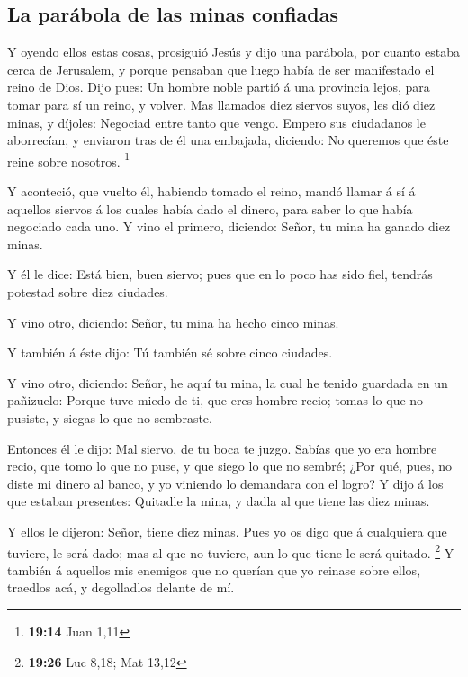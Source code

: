 \hypertarget{la-paruxe1bola-de-las-minas-confiadas}{%
\subsection{La parábola de las minas
confiadas}\label{la-paruxe1bola-de-las-minas-confiadas}}

 Y oyendo ellos estas cosas, prosiguió Jesús y dijo una
parábola, por cuanto estaba cerca de Jerusalem, y porque pensaban que
luego había de ser manifestado el reino de Dios.  Dijo
pues: Un hombre noble partió á una provincia lejos, para tomar para sí
un reino, y volver.  Mas llamados diez siervos suyos, les
dió diez minas, y díjoles: Negociad entre tanto que vengo.
 Empero sus ciudadanos le aborrecían, y enviaron tras de
él una embajada, diciendo: No queremos que éste reine sobre nosotros.
\footnote{\textbf{19:14} Juan 1,11}

 Y aconteció, que vuelto él, habiendo tomado el reino,
mandó llamar á sí á aquellos siervos á los cuales había dado el dinero,
para saber lo que había negociado cada uno.  Y vino el
primero, diciendo: Señor, tu mina ha ganado diez minas.

 Y él le dice: Está bien, buen siervo; pues que en lo
poco has sido fiel, tendrás potestad sobre diez ciudades.

 Y vino otro, diciendo: Señor, tu mina ha hecho cinco
minas.

 Y también á éste dijo: Tú también sé sobre cinco
ciudades.

 Y vino otro, diciendo: Señor, he aquí tu mina, la cual
he tenido guardada en un pañizuelo:  Porque tuve miedo de
ti, que eres hombre recio; tomas lo que no pusiste, y siegas lo que no
sembraste.

 Entonces él le dijo: Mal siervo, de tu boca te juzgo.
Sabías que yo era hombre recio, que tomo lo que no puse, y que siego lo
que no sembré;  ¿Por qué, pues, no diste mi dinero al
banco, y yo viniendo lo demandara con el logro?  Y dijo á
los que estaban presentes: Quitadle la mina, y dadla al que tiene las
diez minas.

 Y ellos le dijeron: Señor, tiene diez minas.
 Pues yo os digo que á cualquiera que tuviere, le será
dado; mas al que no tuviere, aun lo que tiene le será quitado.
\footnote{\textbf{19:26} Luc 8,18; Mat 13,12}  Y también
á aquellos mis enemigos que no querían que yo reinase sobre ellos,
traedlos acá, y degolladlos delante de mí.

